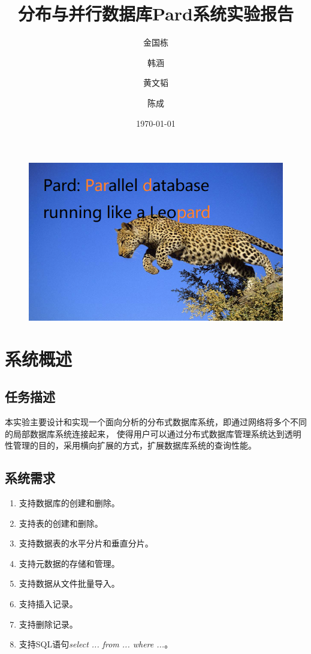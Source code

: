 \documentclass[a4paper, 12pt]{ctexart}
\author{金国栋\\
	\and
	韩涵\\
	\and
	黄文韬\\
	\and
	陈成\\
}
\title{分布与并行数据库Pard系统实验报告}
\date{\today}
\begin{document}
\maketitle%
\hspace{8em}
\begin{figure}[h]
	\centering
	\includegraphics[width=0.7\linewidth]{figure/leopard.png}
\end{figure}

\newpage
 
\tableofcontents
 
 
\section{系统概述}
\subsection{任务描述}
本实验主要设计和实现一个面向分析的分布式数据库系统，即通过网络将多个不同的局部数据库系统连接起来，
使得用户可以通过分布式数据库管理系统达到透明性管理的目的，采用横向扩展的方式，扩展数据库系统的查询性能。

\subsection{系统需求}
\begin{enumerate}
\item 支持数据库的创建和删除。
\item 支持表的创建和删除。
\item 支持数据表的水平分片和垂直分片。
\item 支持元数据的存储和管理。
\item 支持数据从文件批量导入。
\item 支持插入记录。
\item 支持删除记录。
\item 支持SQL语句\textit{select ... from ... where ...}。
\end{enumerate}
\end{document}
